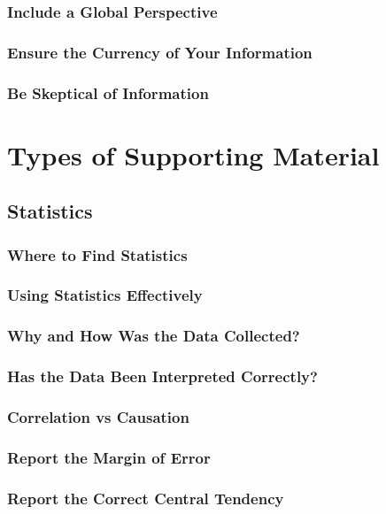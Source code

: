 \documentclass{report}
\begin{document}
        \subsubsection{Include a Global Perspective}
        \subsubsection{Ensure the Currency of Your Information}
        \subsubsection{Be Skeptical of Information}

    \section{Types of Supporting Material}
        \subsection{Statistics}
            \subsubsection{Where to Find Statistics}
            \subsubsection{Using Statistics Effectively}
            \subsubsection{Why and How Was the Data Collected?}
            \subsubsection{Has the Data Been Interpreted Correctly?}
                \subsubsection{Correlation vs Causation}
            \subsubsection{Report the Margin of Error}
            \subsubsection{Report the Correct Central Tendency}
\end{document}
